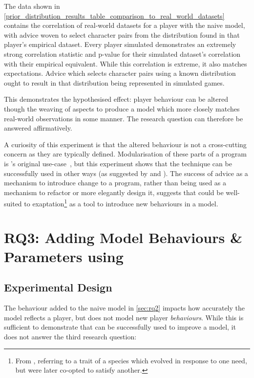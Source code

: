 The data shown in
\cref{prior_distribution_results_table_comparison_to_real_world_datasets}
contains the correlation of real-world datasets for a player with the naive
model, with advice woven to select character pairs from the distribution found
in that player's empirical dataset. Every player simulated demonstrates an
extremely strong correlation statistic and p-value for their simulated dataset's
correlation with their empirical equivalent. While this correlation is extreme,
it also matches expectations. Advice which selects character pairs using a known
distribution ought to result in that distribution being represented in
simulated games.

This demonstrates the hypothesised effect: player behaviour can be altered
though the weaving of aspects to produce a model which more closely matches
real-world observations in some manner. The research question can therefore be
answered affirmatively.

A curiosity of this experiment is that the altered behaviour is not a
cross-cutting concern as they are typically defined. Modularisation of these
parts of a program is \aop{}'s original use-case~\cite{kiczales1997aspect}, but
this experiment shows that the technique can be successfully used in other ways
(as suggested by \citet{gulyas1999use} and \citet{steimann06paradoxical}). The
success of advice as a mechanism to introduce change to a program, rather than
being used as a mechanism to refactor or more elegantly design it, suggests that
\aop{} could be well-suited to exaptation\footnote{From
\citet{exaptation_origin}, referring to a trait of a species which evolved in
response to one need, but were later co-opted to satisfy another.} as a tool to
introduce new behaviours in a model.



\section{RQ3: Adding Model Behaviours \& Parameters using \AspectOrientation}
\label{sec:rq3}

\subsection{Experimental Design}

The behaviour added to the naive model in \cref{sec:rq2} impacts how accurately
the model reflects a player, but does not model new player \emph{behaviours}.
While this is sufficient to demonstrate that \aop{} can be successfully used to
improve a model, it does not answer the third research question:

